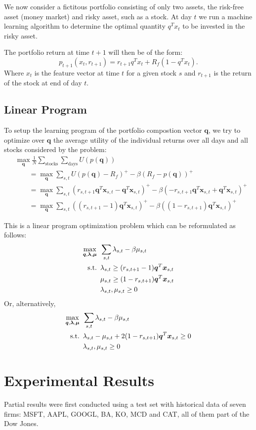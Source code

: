 \documentclass[11pt,fleqn]{article}
\begin{document}
We now consider a fictitous portfolio consisting of only two assets, the risk-free asset
(money market) and risky asset, such as a stock. At day $t$ we run a machine learning
algorithm to determine the optimal quantity $q^Tx_t$ to be invested in the risky asset. 

The portfolio return at time $t+1$  will then be of the form:
\begin{equation*}
  p_{t+1}(x_t,r_{t+1}) = r_{t+1}q^Tx_t + R_f(1-q^Tx_t).
\end{equation*}
Where $x_t$ is the feature vector at time $t$ for a given stock $s$ and $r_{t+1}$ is the
return of the stock at end of day $t$.

\subsection{Linear Program}


To setup the learning program of the portfolio compostion vector $\bm q$, we try to
optimize over $\bm q$ the average utility of the individual returns over all days and all
stocks considered by the problem:
\begin{align*}
  &\max_{\bm q} \frac{1}{N} \sum_{\text{stocks}}\sum_{\text{days}} U(p(\bm q))\\
  &\qquad=\max_{\bm q} \sum_{s,t} U(p(\bm q)-R_f)^+ - \beta (R_f - p(\bm q))^+\\
  &\qquad = \max_{\bm q} \sum_{s,t} (r_{s,t+1} \bm q^T \bm x_{s,t} - \bm q^T \bm
    x_{s,t})^+ -\beta(-r_{s,t+1}\bm q^T \bm x_{s,t}+\bm q^T\bm x_{s,t})^+\\
  &\qquad = \max_{\bm q} \sum_{s,t} ((r_{s,t+1}-1)\bm q^T\bm x_{s,t})^+
    -\beta((1-r_{s,t+1})\bm q^T\bm x_{s,t})^+
\end{align*}

This is a linear program optimization problem which can be reformulated as follows:
\begin{align*}
  \max_{\bm q,\bm\lambda,\bm\mu} &\hspace{0.5em} \sum_{s,t} \lambda_{s,t} - \beta\mu_{s,t}\\
  \mathrm{s.t.} &\hspace{0.5em} \lambda_{s,t} \geq (r_{s,t+1}-1)\bm q^T\bm x_{s,t}\\
  &\hspace{0.5em} \mu_{s,t} \geq (1-r_{s,t+1})\bm q^T\bm x_{s,t}\\
  &\hspace{0.5em} \lambda_{s,t}, \mu_{s,t} \geq 0
\end{align*}
Or, alternatively,
\begin{align*}
  \max_{\bm q,\bm \lambda,\bm \mu}  &\hspace{0.5em} \sum_{s,t} \lambda_{s,t} - \beta \mu_{s,t}\\
  \mathrm{s.t.} &\hspace{0.5em} \lambda_{s,t} - \mu_{s,t} + 2(1-r_{s,t+1})\bm q^T\bm x_{s,t} \geq 0\\
  &\hspace{0.5em} \lambda_{s,t}, \mu_{s,t} \geq 0
\end{align*}


\section{Experimental Results}

Partial results were first conducted using a test set with historical data of seven firms:
MSFT, AAPL, GOOGL, BA, KO, MCD and CAT, all of them part of the Dow Jones.
\end{document}
